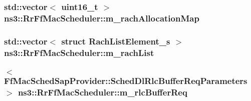 \subsubsection[{\texorpdfstring{m\+\_\+rach\+Allocation\+Map}{m_rachAllocationMap}}]{\setlength{\rightskip}{0pt plus 5cm}std\+::vector$<$ uint16\+\_\+t $>$ ns3\+::\+Rr\+Ff\+Mac\+Scheduler\+::m\+\_\+rach\+Allocation\+Map\hspace{0.3cm}{\ttfamily [private]}}\hypertarget{classns3_1_1RrFfMacScheduler_ac3a35483a21997065f49ff72707a90aa}{}\label{classns3_1_1RrFfMacScheduler_ac3a35483a21997065f49ff72707a90aa}
\subsubsection[{\texorpdfstring{m\+\_\+rach\+List}{m_rachList}}]{\setlength{\rightskip}{0pt plus 5cm}std\+::vector$<$ struct {\bf Rach\+List\+Element\+\_\+s} $>$ ns3\+::\+Rr\+Ff\+Mac\+Scheduler\+::m\+\_\+rach\+List\hspace{0.3cm}{\ttfamily [private]}}\hypertarget{classns3_1_1RrFfMacScheduler_a471cdca79a50c90f7c871c15d02755fc}{}\label{classns3_1_1RrFfMacScheduler_a471cdca79a50c90f7c871c15d02755fc}
\subsubsection[{\texorpdfstring{m\+\_\+rlc\+Buffer\+Req}{m_rlcBufferReq}}]{$<$ {\bf Ff\+Mac\+Sched\+Sap\+Provider\+::\+Sched\+Dl\+Rlc\+Buffer\+Req\+Parameters} $>$ ns3\+::\+Rr\+Ff\+Mac\+Scheduler\+::m\+\_\+rlc\+Buffer\+Req\hspace{0.3cm}{\ttfamily [private]}}\hypertarget{classns3_1_1RrFfMacScheduler_a25a4bfbb928e22dc026209de004b90fd}{}\label{classns3_1_1RrFfMacScheduler_a25a4bfbb928e22dc026209de004b90fd}
